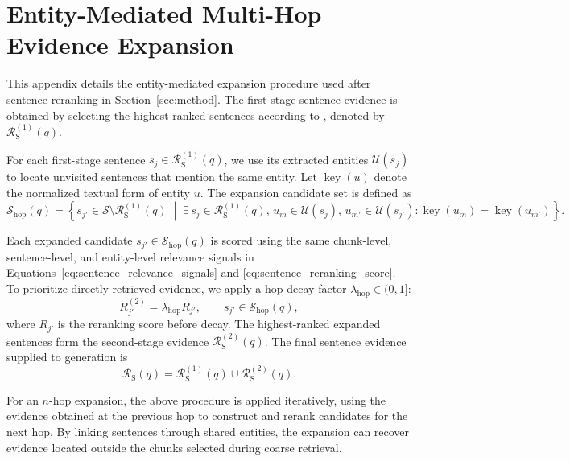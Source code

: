 \documentclass{article} %
\begin{document}
\section{Entity-Mediated Multi-Hop Evidence Expansion}
\label{app:entity_mediated_expansion}

This appendix details the entity-mediated expansion procedure used after
sentence reranking in Section~\ref{sec:method}. The first-stage sentence
evidence is obtained by selecting the highest-ranked sentences according to
, denoted by
$\mathcal{R}_{\mathrm{S}}^{(1)}(q)$.

For each first-stage sentence $s_j\in\mathcal{R}_{\mathrm{S}}^{(1)}(q)$, we
use its extracted entities $\mathcal{U}(s_j)$ to locate unvisited sentences
that mention the same entity. Let $\operatorname{key}(u)$ denote the
normalized textual form of entity $u$. The expansion candidate set is defined
as
\begin{equation}
\mathcal{S}_{\mathrm{hop}}(q)
=
\left\{
s_{j'}\in\mathcal{S}\setminus\mathcal{R}_{\mathrm{S}}^{(1)}(q)
\;\middle|\;
\exists\,s_j\in\mathcal{R}_{\mathrm{S}}^{(1)}(q),\,
u_m\in\mathcal{U}(s_j),\,
u_{m'}\in\mathcal{U}(s_{j'}):
\operatorname{key}(u_m)=\operatorname{key}(u_{m'})
\right\}.
\label{eq:entity_mediated_expansion_candidates}
\end{equation}

Each expanded candidate $s_{j'}\in\mathcal{S}_{\mathrm{hop}}(q)$ is scored
using the same chunk-level, sentence-level, and entity-level relevance
signals in Equations~\ref{eq:sentence_relevance_signals} and
\ref{eq:sentence_reranking_score}. To prioritize directly retrieved evidence,
we apply a hop-decay factor $\lambda_{\mathrm{hop}}\in(0,1]$:
\begin{equation}
R_{j'}^{(2)}
=
\lambda_{\mathrm{hop}} R_{j'},
\qquad
s_{j'}\in\mathcal{S}_{\mathrm{hop}}(q),
\label{eq:hop_expansion_score}
\end{equation}
where $R_{j'}$ is the reranking score before decay. The highest-ranked
expanded sentences form the second-stage evidence
$\mathcal{R}_{\mathrm{S}}^{(2)}(q)$. The final sentence evidence supplied to
generation is
\begin{equation}
\mathcal{R}_{\mathrm{S}}(q)
=
\mathcal{R}_{\mathrm{S}}^{(1)}(q)
\cup
\mathcal{R}_{\mathrm{S}}^{(2)}(q).
\label{eq:multi_hop_sentence_evidence}
\end{equation}

For an $n$-hop expansion, the above procedure is applied iteratively, using the evidence obtained at the previous hop to construct and rerank candidates for the next hop. By linking sentences through shared entities, the expansion can recover evidence located outside the chunks selected during coarse retrieval. 
\end{document}
